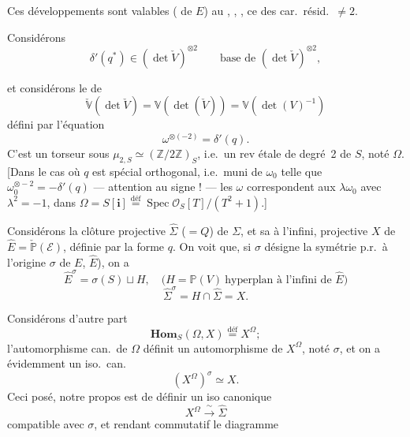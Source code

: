\documentclass[11pt,a4paper]{article}
\begin{document}
Ces développements sont valables \ill{} \ill{} (\ill{} de $E$) au \ill{} , \ill{} , \ill{} \ill{} \ill{} \ill{}, ce \ill{} des car.\ résid.\ $\neq 2$.

Considérons
\[
  \delta'(q^{\ast}) \in (\det \check{V})^{\otimes 2}
  \qquad \text{base de } (\det \check{V})^{\otimes 2},
\]

et considérons le \ill{} de
\[
  \check{\mathbb{V}}(\det \check{V}) = \mathbb{V}(\det(\check{V})) = \mathbb{V}(\det(V)^{-1})
\]
défini par l'équation
\[
  \omega^{\otimes(-2)} = \delta'(q).
\]
C'est un torseur sous $\mu_{2,S} \simeq (\mathbb{Z}/2\mathbb{Z})_{S}$, i.e.\ un rev étale de degré~2 de $S$,  noté $\Omega$. [Dans le cas où $q$ est spécial orthogonal, i.e.\ muni de $\omega_{0}$ telle que $\omega_{0}^{\otimes -2} = -\delta'(q)$ --- attention au signe ! --- les $\omega$ correspondent aux $\lambda\omega_{0}$ avec $\lambda^{2} = -1$, dans $\Omega = S[\mathbf{i}] \overset{\text{déf}}{=} \operatorname{Spec} \mathcal{O}_{S}[T]/(T^{2}+1)$.]

Considérons la clôture projective $\hat{\Sigma}$ ($= Q$) de $\Sigma$, et \struck{\ill{}} sa \ill{} à l'infini, \struck{\ill{}}  projective $X$   \ill{} de $\hat{E} = \check{\mathbb{P}}(\mathcal{E})$, définie par la forme $q$. On voit que, si $\sigma$ désigne la \struck{\ill{}} symétrie p.r.\ à l'origine $\sigma$ de $E$, \ill{} \ill{} $\hat{E}$), on a
\[
  \hat{E}^{\sigma} = \sigma(S) \sqcup H, \quad \text{(}H = \mathbb{P}(V)\ \text{hyperplan à l'infini de } \hat{E}\text{)}
\]
\[
  \hat{\Sigma}^{\sigma} = H \cap \hat{\Sigma} = X.
\]


Considérons  d'autre part
\[
  \mathbf{Hom}_{S}(\Omega, X) \overset{\text{déf}}{=} X^{\Omega} ;
\]
l'automorphisme can.\ de $\Omega$ définit un automorphisme de $X^{\Omega}$, noté  $\sigma$,  et on a évidemment un iso.\ can.
\[
  (X^{\Omega})^{\sigma} \simeq X.
\]
Ceci posé, notre propos est de définir un iso canonique
\[
  X^{\Omega} \xrightarrow{\ \sim\ } \hat{\Sigma}
\]
compatible avec $\sigma$, et rendant commutatif le diagramme
\end{document}

